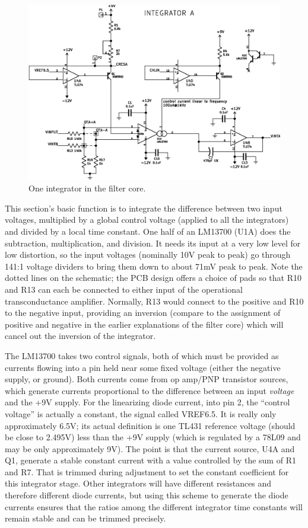 \begin{figure}
\centering\includegraphics[width=\linewidth]{integrator}\par
\caption{One integrator in the filter core.}\label{fig:integrator}
\end{figure}

This section's basic function is to integrate the difference between two
input voltages, multiplied by a global control voltage (applied to all the
integrators) and divided by a local time constant.  One half of an LM13700
(U1A) does the subtraction, multiplication, and division.  It needs its
input at a very low level for low distortion, so the input voltages
(nominally 10V peak to peak) go through 141:1 voltage dividers to bring them
down to about 71mV peak to peak.  Note the dotted lines on the schematic;
the PCB design offers a choice of pads so that R10 and R13 can each be
connected to either input of the operational transconductance amplifier. 
Normally, R13 would connect to the positive and R10 to the negative input,
providing an inversion (compare to the assignment of positive and negative
in the earlier explanations of the filter core) which will cancel out the
inversion of the integrator.

The LM13700 takes two control signals, both of which must be provided as
currents flowing into a pin held near some fixed voltage (either the
negative supply, or ground).  Both currents come from
op amp/PNP transistor sources, which generate currents proportional
to the difference between an input \emph{voltage} and the +9V supply. 
For the linearizing diode current, into pin 2, the ``control voltage'' is
actually a constant, the signal called VREF6.5.  It is really only
approximately 6.5V; its actual definition is one TL431 reference voltage
(should be close to 2.495V) less than the +9V supply (which is regulated by
a 78L09 and may be only approximately 9V).  The point is that the current
source, U4A and Q1, generate a stable constant current with a value
controlled by the sum of R1 and R7.  That is trimmed during adjustment to
set the constant coefficient for this integrator stage.  Other integrators
will have different resistances and therefore different diode currents, but
using this scheme to generate the diode currents ensures that the ratios
among the different integrator time constants will remain stable and can be
trimmed precisely.

